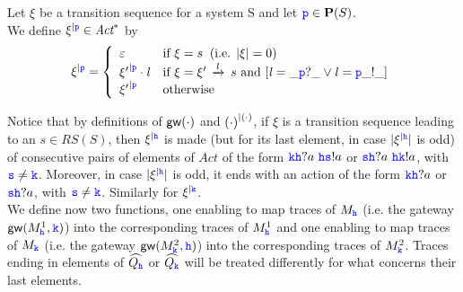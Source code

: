 \begin{definition}
Let $\xi$ be a transition sequence for a system S and let $\ttp\in\roles(S)$.\\
We define $\restrictup{\xi}{\ttp}\in \textit{Act}^*$  by 
$$\restrictup{\xi}{\ttp} = \left\{\begin{array}{ll}
                                                \varepsilon & \text{if } \xi=s  \;\; (\text{i.e. } |\xi|=0) \\
                                               \restrictup{\xi'}{\ttp}\cdot\elle & 
                                                         \text{if } \xi=\xi'\lts{\elle}s \text{ and } [ \elle= \_\ttp?\_  \vee \elle= \ttp\_!\_ ]\\
                                               \restrictup{\xi'}{\ttp}  & \text{otherwise}
                                      \end{array} \right. 
$$
\end{definition}

Notice that by definitions of $\gateway{\cdot}$ and  $\restrictup{(\cdot)}{(\cdot)}$,  
if $\xi$ is a transition sequence leading to an $s\in RS(S)$, then
 $\restrictup{\xi}{\HH}$ is made (but for its last element, in case $|\restrictup{\xi}{\HH}|$ is odd) of consecutive pairs of elements of $\textit{Act}$  of the form
$\KK\HH?a \,\, \HH\tts!a$ or $\tts\HH?a \,\,\HH\KK!a$, with $\tts\neq\KK$.
Moreover, in case $|\restrictup{\xi}{\HH}|$ is odd, it ends with an action of the form
$\KK\HH?a$ or $\tts\HH?a$, with $\tts\neq\KK$.
Similarly for $\restrictup{\xi}{\KK}$.\\

We define now two functions, one enabling to map traces of ${M_\HH}$ (i.e. the gateway $\gateway{M^1_\HH, \KK}$)
  into the corresponding traces of ${M^1_\HH}$
and one enabling to map traces of ${M_\KK}$  (i.e. the gateway $\gateway{M^2_\KK, \HH}$) into the corresponding traces of ${M^2_\KK}$.
Traces ending in elements of $\widehat{Q_\HH}$ or $\widehat{Q_\KK}$ will be treated differently
for what concerns their last elements.

